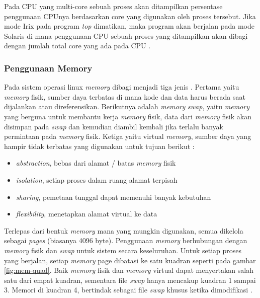 Pada CPU yang multi-core sebuah proses akan ditampilkan persentase penggunaan CPUnya berdasarkan core yang digunakan oleh proses tersebut. Jika mode Irix pada program \textit{top} dimatikan, maka program akan berjalan pada mode Solaris di mana penggunaan CPU sebuah proses yang ditampilkan akan dibagi dengan jumlah total core yang ada pada CPU \cite{manual:linux}.

\subsubsection{Penggunaan Memory}

Pada sistem operasi linux \textit{memory} dibagi menjadi tiga jenis \cite{manual:linux}. Pertama yaitu \textit{memory} fisik, sumber daya terbatas di mana kode dan data harus berada saat dijalankan atau direferensikan. Berikutnya adalah \textit{memory} \textit{swap}, yaitu  \textit{memory} yang berguna untuk membantu kerja \textit{memory} fisik, data dari \textit{memory} fisik akan disimpan pada \textit{swap} dan kemudian diambil kembali jika terlalu banyak permintaan pada \textit{memory} fisik. Ketiga yaitu virtual \textit{memory}, sumber daya yang hampir tidak terbatas yang digunakan untuk tujuan berikut \cite{book:os}:

\begin{itemize} [noitemsep, topsep=0pt]
    \item \textit{abstraction}, bebas dari alamat / batas \textit{memory} fisik 
    \item \textit{isolation}, setiap proses dalam ruang alamat terpisah 
    \item \textit{sharing}, pemetaan tunggal dapat memenuhi banyak kebutuhan 
    \item \textit{flexibility}, menetapkan alamat virtual ke data 
\end{itemize}

Terlepas dari bentuk \textit{memory} mana yang mungkin digunakan, semua dikelola sebagai \textit{pages} (biasanya 4096
byte). Penggunaan \textit{memory} berhubungan dengan \textit{memory} fisik dan \textit{swap} untuk sistem secara keseluruhan. 
Untuk setiap proses yang berjalan, setiap \textit{memory} page dibatasi ke satu kuadran seperti pada gambar \ref{fig:mem-quad}. Baik \textit{memory} fisik dan \textit{memory} virtual dapat menyertakan salah satu dari empat kuadran, sementara file \textit{swap} hanya mencakup kuadran 1 sampai 3. Memori di kuadran 4, bertindak sebagai file \textit{swap} khusus ketika dimodifikasi \cite{manual:linux}. 

